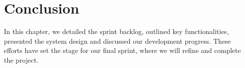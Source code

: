 \section{Conclusion}
In this chapter, we detailed the sprint backlog, outlined key functionalities, presented the system design and discussed our development progress. These efforts have set the stage for our final sprint, where we will refine and complete the project.